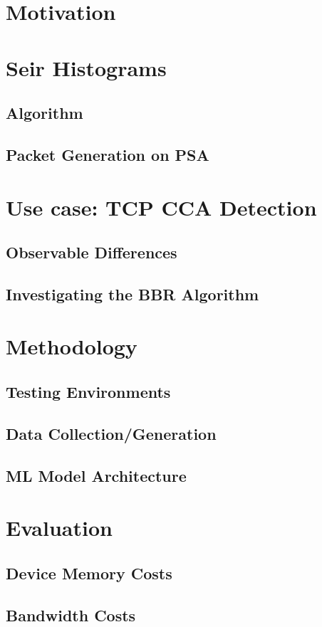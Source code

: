 \documentclass[twoside,hidelinks]{glasgowthesis}
\begin{document}
\section{Motivation}
\section{Sei\dh{}r Histograms}
\subsection{Algorithm}
\subsection{Packet Generation on PSA}
\section{Use case: TCP CCA Detection}
\subsection{Observable Differences}
\subsection{Investigating the BBR Algorithm}
\section{Methodology}
\subsection{Testing Environments}
\subsection{Data Collection/Generation}
\subsection{ML Model Architecture}
\section{Evaluation}
\subsection{Device Memory Costs}
\subsection{Bandwidth Costs}
\end{document}
